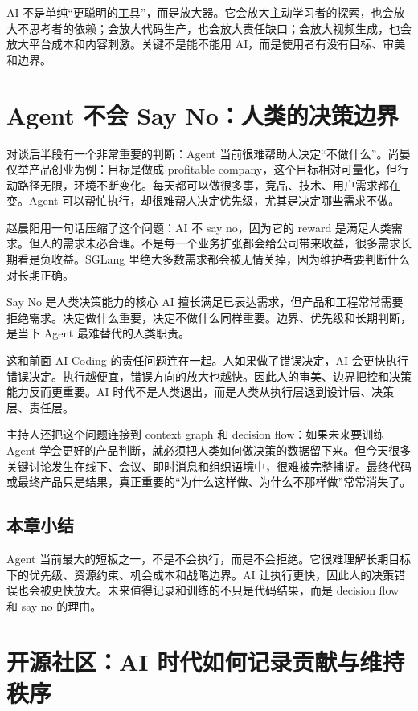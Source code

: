 \documentclass[a4paper]{article}
\begin{document}
AI 不是单纯“更聪明的工具”，而是放大器。它会放大主动学习者的探索，也会放大不思考者的依赖；会放大代码生产，也会放大责任缺口；会放大视频生成，也会放大平台成本和内容刺激。关键不是能不能用 AI，而是使用者有没有目标、审美和边界。

\section{Agent 不会 Say No：人类的决策边界}

对谈后半段有一个非常重要的判断：Agent 当前很难帮助人决定“不做什么”。尚晏仪举产品创业为例：目标是做成 profitable company，这个目标相对可量化，但行动路径无限，环境不断变化。每天都可以做很多事，竞品、技术、用户需求都在变。Agent 可以帮忙执行，却很难帮人决定优先级，尤其是决定哪些需求不做。

赵晨阳用一句话压缩了这个问题：AI 不 say no，因为它的 reward 是满足人类需求。但人的需求未必合理。不是每一个业务扩张都会给公司带来收益，很多需求长期看是负收益。SGLang 里绝大多数需求都会被无情关掉，因为维护者要判断什么对长期正确。

\begin{importantbox}{Say No 是人类决策能力的核心}
AI 擅长满足已表达需求，但产品和工程常常需要拒绝需求。决定做什么重要，决定不做什么同样重要。边界、优先级和长期判断，是当下 Agent 最难替代的人类职责。
\end{importantbox}

这和前面 AI Coding 的责任问题连在一起。人如果做了错误决定，AI 会更快执行错误决定。执行越便宜，错误方向的放大也越快。因此人的审美、边界把控和决策能力反而更重要。AI 时代不是人类退出，而是人类从执行层退到设计层、决策层、责任层。

主持人还把这个问题连接到 context graph 和 decision flow：如果未来要训练 Agent 学会更好的产品判断，就必须把人类如何做决策的数据留下来。但今天很多关键讨论发生在线下、会议、即时消息和组织语境中，很难被完整捕捉。最终代码或最终产品只是结果，真正重要的“为什么这样做、为什么不那样做”常常消失了。

\subsection{本章小结}

Agent 当前最大的短板之一，不是不会执行，而是不会拒绝。它很难理解长期目标下的优先级、资源约束、机会成本和战略边界。AI 让执行更快，因此人的决策错误也会被更快放大。未来值得记录和训练的不只是代码结果，而是 decision flow 和 say no 的理由。

\section{开源社区：AI 时代如何记录贡献与维持秩序}
\end{document}

